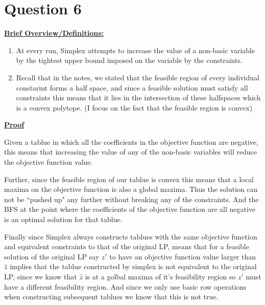 \documentclass{article}
\numberwithin{equation}{subsection}
\begin{document}
	\section{Question 6}
		\textbf{\underline{Brief Overview/Definitions:}}
		\begin{enumerate}
			\item At every run, Simplex attempts to increase the value of a non-basic 
					variable by the tightest upper bound imposed on the variable by the constraints. 
			\item Recall that in the notes, we stated that the feasible region of every individual constarint forms a 
				half space, and since a feasible solution must satisfy all constraints this means that it lies in the 
				intersection of these halfspaces which is a convex polytope. (I focus on the fact that the feasible region is convex)
		\end{enumerate}

		\textbf{\underline{Proof}}
		\par{Given a tablue in which all the coefficients in the objective function are negative, this means that increasing the 
				value of any of the non-basic variables will reduce the objective function value.}
		\par{Further, since the feasible region of our tablue is convex this means that a local maxima on the objective function is also a 
		global maxima. Thus the solution can not be ``pushed up" any further without breaking any of the constraints. And the BFS 
		at the point where the coefficients of the objective function are all negative is an optimal solution for that tablue.}
		
		\par{Finally since Simplex always constructs tablues with the same objective function and equivalent constraints to that 
				of the original LP, means that for a feasible solution of the original LP say $z'$ to have an objective function value 
				larger than $\hat{z}$ implies that the tablue constructed by simplex is not equivalent to the original LP, since 
				we know that $\hat{z}$ is at a golbal maxima of it's feasibility region so $z'$ must have a different feasibility region.
				And since we only use basic row operations when constructing subsequent tablues we know that this is not true. }
\end{document}
